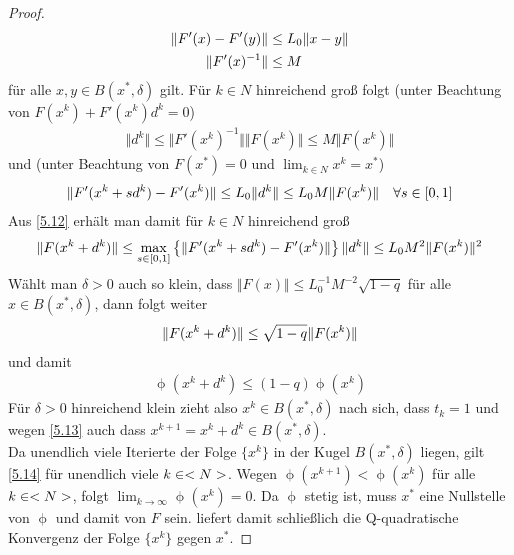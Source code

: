 \begin{proof}
	\begin{align}
		\Vert F'(x) - F'(y)\Vert &\le L_0\Vert x-y\Vert \notag \\
		\Vert F'(x)^{-1}\Vert &\le M\notag
	\end{align}
	für alle $x,y\in B(x^\ast,\delta)$ gilt. Für $k\in N$ hinreichend groß folgt (unter Beachtung von $F(x^k) + F'(x^k)d^k=0$)
	\begin{align}
		\label{5.13}
		\Vert d^k\Vert \le \Vert F'(x^k)^{-1}\Vert\Vert F(x^k)\Vert \le M\Vert F(x^k)\Vert
	\end{align}
	und (unter Beachtung von $F(x^\ast)=0$ und $\lim_{k\in N}x^k=x^\ast$)
	\begin{align}
		\Vert F'(x^k+sd^k) - F'(x^k)\Vert \le L_0\Vert d^k\Vert\le L_0M\Vert F(x^k)\Vert\quad\forall s\in [0,1]\notag
	\end{align}
	Aus \cref{5.12} erhält man damit für $k\in N$ hinreichend groß
	\begin{align}
		\Vert F(x^k+d^k)\Vert \le\max\limits_{s\in [0,1]} \left\lbrace \Vert F'(x^k + sd^k) - F'(x^k)\Vert\right\rbrace \Vert d^k\Vert\le L_0M^2\Vert F(x^k)\Vert^2\notag
	\end{align}
	Wählt man $\delta>0$ auch so klein, dass $\Vert F(x)\Vert\le L_0^{-1}M^{-2}\sqrt{1-q}$ für alle $x\in B(x^\ast,\delta)$, dann folgt weiter
	\begin{align}
		\Vert F(x^k+d^k)\Vert \le \sqrt{1-q}\Vert F(x^k)\Vert\notag 
	\end{align}
	und damit
	\begin{align}
		\label{5.14}
		\upphi(x^k+d^k) \le (1-q)\upphi(x^k)
	\end{align}
	Für $\delta>0$ hinreichend klein zieht also $x^k\in B(x^\ast,\delta)$ nach sich, dass $t_k=1$ und wegen \cref{5.13} auch dass $x^{k+1}=x^k+d^k\in B(x^\ast,\delta)$. \\
	Da unendlich viele Iterierte der Folge $\{x^k\}$ in der Kugel $B(x^\ast,\delta)$ liegen, gilt \cref{5.14} für unendlich viele $k\in <N>$. Wegen $\upphi(x^{k+1})<\upphi(x^k)$ für alle $k\in<N>$, folgt $\lim_{k\to\infty}\upphi(x^k)=0$. Da $\upphi$ stetig ist, muss $x^\ast$ eine Nullstelle von $\upphi$ und damit von $F$ sein.  liefert damit schließlich die Q-quadratische Konvergenz der Folge $\{x^k\}$ gegen $x^\ast$.
\end{proof}

